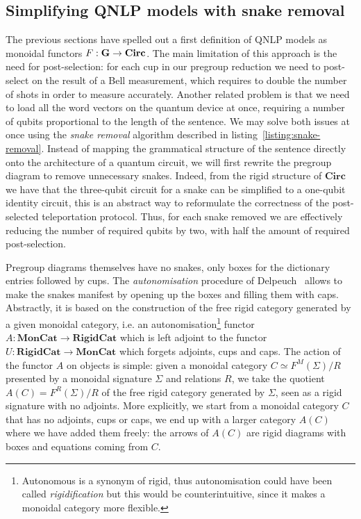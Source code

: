 
\subsection{Simplifying QNLP models with snake removal}

The previous sections have spelled out a first definition of QNLP models as monoidal functors $F : \mathbf{G} \to \mathbf{Circ}$.
The main limitation of this approach is the need for post-selection: for each cup in our pregroup reduction we need to post-select on the result of a Bell measurement, which requires to double the number of shots in order to measure accurately.
Another related problem is that we need to load all the word vectors on the quantum device at once, requiring a number of qubits proportional to the length of the sentence.
We may solve both issues at once using the \emph{snake removal} algorithm described in listing~\ref{listing:snake-removal}.
Instead of mapping the grammatical structure of the sentence directly onto the architecture of a quantum circuit, we will first rewrite the pregroup diagram to remove unnecessary snakes.
Indeed, from the rigid structure of $\mathbf{Circ}$ we have that the three-qubit circuit for a snake can be simplified to a one-qubit identity circuit, this is an abstract way to reformulate the correctness of the post-selected teleportation protocol.
Thus, for each snake removed we are effectively reducing the number of required qubits by two, with half the amount of required post-selection.

Pregroup diagrams themselves have no snakes, only boxes for the dictionary entries followed by cups.
The \emph{autonomisation} procedure of Delpeuch~\cite{Delpeuch19} allows to make the snakes manifest by opening up the boxes and filling them with caps.
Abstractly, it is based on the construction of the free rigid category generated by a given monoidal category, i.e. an autonomisation\footnote
{Autonomous is a synonym of rigid, thus autonomisation could have been called \emph{rigidification} but this would be counterintuitive, since it makes a monoidal category more flexible.}
functor $A : \mathbf{MonCat} \to \mathbf{RigidCat}$ which is left adjoint to the functor $U : \mathbf{RigidCat} \to \mathbf{MonCat}$ which forgets adjoints, cups and caps.
The action of the functor $A$ on objects is simple: given a monoidal category $C \simeq F^M(\Sigma) / R$ presented by a monoidal signature $\Sigma$ and relations $R$, we take the quotient $A(C) = F^R(\Sigma) / R$ of the free rigid category generated by $\Sigma$, seen as a rigid signature with no adjoints.
More explicitly, we start from a monoidal category $C$ that has no adjoints, cups or caps, we end up with a larger category $A(C)$ where we have added them freely: the arrows of $A(C)$ are rigid diagrams with boxes and equations coming from $C$.

